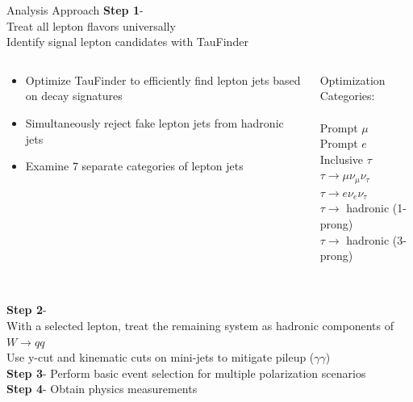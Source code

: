 \documentclass[10pt]{beamer}
\begin{document}
\begin{frame}{Analysis Approach}
\textbf{Step 1}-\\
Treat all lepton flavors universally\\
Identify signal lepton candidates with TauFinder\\
\scriptsize
\begin{columns}
\begin{column}{0.5\textwidth}
\begin{itemize}
\item Optimize TauFinder to efficiently find lepton jets based on decay signatures
\item Simultaneously reject fake lepton jets from hadronic jets
\item Examine 7 separate categories of lepton jets
\end{itemize}
\end{column}
\begin{column}{0.5\textwidth}

		Optimization Categories:\\
		\quad \quad \\
		Prompt $\mu$\\
		Prompt $e$\\
		Inclusive $\tau$\\
		$\tau\rightarrow \mu \nu_{\mu} \nu_{\tau}$ \\
		$\tau\rightarrow e \nu_{e} \nu_{\tau}$\\
		$\tau \rightarrow$ hadronic (1-prong)\\
		$\tau \rightarrow$ hadronic (3-prong)\\

\end{column}
\end{columns}
\quad \quad \quad 
\\	%
	\normalsize
\textbf{Step 2}-\\
With a selected lepton, treat the remaining system as hadronic components of $W\rightarrow qq$\\
\quad \quad \scriptsize Use y-cut and kinematic cuts on mini-jets to mitigate pileup ($\gamma \gamma$)\\
\normalsize
\textbf{Step 3}- Perform basic event selection for multiple polarization scenarios\\
\textbf{Step 4}- Obtain physics measurements\\
\end{frame}
\end{document}
